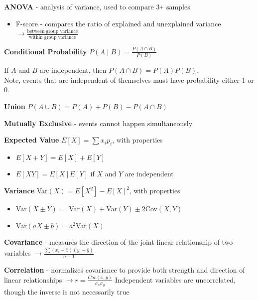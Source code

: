 \documentclass[10pt,landscape]{article}
\newcommand{\plus}{\raisebox{.3\height}{\scalebox{.7}{+}}}
\begin{document}
\begin{multicols}{3}
\textbf{ANOVA} - analysis of variance, used to compare 3$\plus$ samples
\begin{itemize}[label={--},leftmargin=4mm]
    \itemsep -.4mm
    \item F-score - compares the ratio of explained and unexplained variance $\to \frac{\text{between group variance}}{\text{within group variance}}$
\end{itemize}

\smallskip

\textbf{Conditional Probability} $P(A \mid B) = \frac{P(A \cap B)}{P(B)}$

If $A$ and $B$ are independent, then $P(A \cap B) = P(A) P(B)$.\\
Note, events that are independent of themselves must have
probability either 1 or 0.


\textbf{Union} $P(A \cup B) = P(A) + P(B) - P(A \cap B) $

\textbf{Mutually Exclusive} - events cannot happen simultaneously
\smallskip

\textbf{Expected Value} $E[X] = \sum x_i p_i$, with properties
    \begin{itemize}[label={--},leftmargin=4mm]
    \itemsep -.4mm
    \item $E[X + Y] = E[X] + E[Y]$
    \item $E[XY] = E[X]E[Y]$ if $X$ and $Y$ are independent
    \end{itemize}

\textbf{Variance} Var$(X) = E[X^2] - E[X]^2$, with properties
    \begin{itemize}[label={--},leftmargin=4mm]
    \itemsep -.4mm
    \item Var$(X\pm Y) =$ Var$(X) +$Var$(Y) \pm 2$Cov$(X,Y)$
    \item Var$(aX \pm b) = a^2$Var$(X)$
    \end{itemize}

\textbf{Covariance} - measures the direction of the joint linear relationship of two variables
$\to \frac{\sum (x_i - \bar{x}) (y_i - \bar{y})}{n-1} $

\textbf{Correlation} - normalizes covariance to provide both strength and direction of linear relationships $\to r =  \frac{Cov(x,y)}{\sigma_x \sigma_y}$
Independent variables are uncorrelated,  though the inverse is not necessarily true

\newcommand*{\Perm}[2]{{}^{#1}\!P_{#2}}%
\newcommand*{\Comb}[2]{{}^{#1}C_{#2}}%
\smallskip


\end{multicols}
\end{document}
